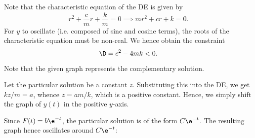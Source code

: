 \begin{solution}
    \begin{ppart}
        Note that the characteristic equation of the DE is given by \[r^2 + \frac{c}{m} r + \frac{k}{m} = 0 \implies m r^2 + cr + k = 0.\] For $y$ to oscillate (i.e. composed of sine and cosine terms), the roots of the characteristic equation must be non-real. We hence obtain the constraint \[\D = c^2 - 4mk < 0.\]
    \end{ppart}
    \begin{ppart}
        Note that the given graph represents the complementary solution.
        \begin{psubpart}
            Let the particular solution be a constant $z$. Substituting this into the DE, we get $kz/m = a$, whence $z = am/k$, which is a positive constant. Hence, we simply shift the graph of $y(t)$ in the positive $y$-axis.

            \begin{figure}[H]
                \centering
            \end{figure}
        \end{psubpart}
        \clearpage
        \begin{psubpart}
            Since $F(t) = b\e^{-t}$, the particular solution is of the form $C\e^{-t}$. The resulting graph hence oscillates around $C\e^{-t}$:


\end{psubpart}
\end{ppart}
\end{solution}
